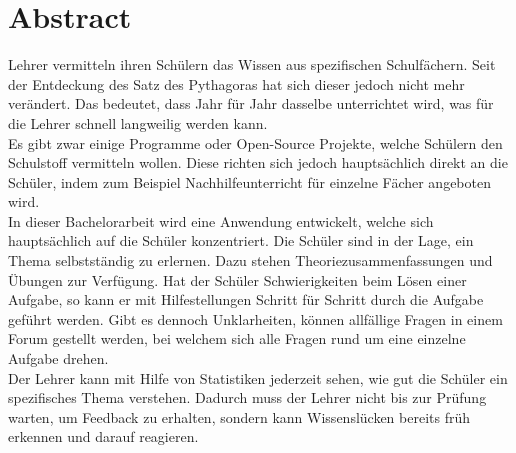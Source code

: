 \afterpage{\blankpage}
\section*{Abstract}
Lehrer vermitteln ihren Schülern das Wissen aus spezifischen Schulfächern. Seit der Entdeckung des Satz des Pythagoras hat sich dieser jedoch nicht mehr verändert. Das bedeutet, dass Jahr für Jahr dasselbe unterrichtet wird, was für die Lehrer schnell langweilig werden kann. \\

Es gibt zwar einige Programme oder Open-Source Projekte, welche Schülern den Schulstoff vermitteln wollen. Diese richten sich jedoch hauptsächlich direkt an die Schüler, indem zum Beispiel Nachhilfeunterricht für einzelne Fächer angeboten wird. \\

In dieser Bachelorarbeit wird eine Anwendung entwickelt, welche sich hauptsächlich auf die Schüler konzentriert. Die Schüler sind in der Lage, ein Thema selbstständig zu erlernen. Dazu stehen Theoriezusammenfassungen und Übungen zur Verfügung. Hat der Schüler Schwierigkeiten beim Lösen einer Aufgabe, so kann er mit Hilfestellungen Schritt für Schritt durch die Aufgabe geführt werden. Gibt es dennoch Unklarheiten, können allfällige Fragen in einem Forum gestellt werden, bei welchem sich alle Fragen rund um eine einzelne Aufgabe drehen. \\

Der Lehrer kann mit Hilfe von Statistiken jederzeit sehen, wie gut die Schüler ein spezifisches Thema verstehen. Dadurch muss der Lehrer nicht bis zur Prüfung warten, um Feedback zu erhalten, sondern kann Wissenslücken bereits früh erkennen und darauf reagieren.

\newpage
